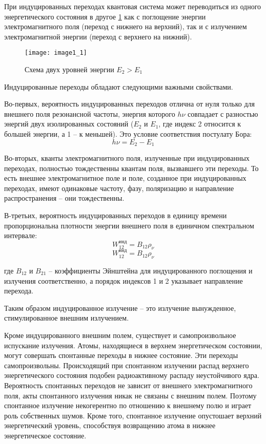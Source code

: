 
При индуцированных переходах квантовая система может переводиться из одного 
энергетического состояния в другое \ref{img1.1} как с поглощение энергии 
электромагнитного поля (переход с нижнего на верхний), так и с излучением 
электромагнитной энергии (переход с верхнего на нижний).

\begin{figure}[h!]
	\center
	\texttt{[image: image1\_1]} \\
	\caption{Схема двух уровней энергии \( E_2 > E_1 \)}
	\label{img1.1}
\end{figure}

Индуцированные переходы обладают следующими важными свойствами.

Во-первых, вероятность индуцированных переходов отлична от нуля только для 
внешнего поля резонансной частоты, энергия которого \( h\nu \) совпадает с 
разностью энергий двух изолированных состояний (\( E_2 \) и \( E_1 \), где 
индекс 2 относится к большей энергии, а 1 -- к меньшей). Это условие 
соответствия постулату Бора:
\[
	h\nu = E_2 - E_1
\]

Во-вторых, кванты электромагнитного поля, излученные при индуцированных 
переходах, полностью тождественны квантам поля, вызвавшего эти переходы. 
То есть внешнее электромагнитное поле и поле, созданное при индуцированных 
переходах, имеют одинаковые частоту, фазу, поляризацию и направление 
распространения -- они тождественны.

В-третьих, вероятность индуцированных переходов в единицу времени 
пропорциональна плотности энергии внешнего поля в единичном спектральном 
интервале:
\[
	W_{12}^\text{инд} = B_{12}\rho_\nu
\]
\[
	W_{12}^\text{инд} = B_{12}\rho_\nu
\]

где \( B_{12} \) и  \( B_{21} \) -- коэффициенты Эйнштейна для индуцированного 
поглощения и излучения соответственно, а порядок индексов 1 и 2 указывает 
направление перехода.

Таким образом индуцированное излучение -- это излучение вынужденное, 
стимулированное внешним излучением. 

Кроме индуцированного внешним полем, существует и самопроизвольное испускание 
излучения. Атомы, находящиеся в верхнем энергетическом состоянии, могут 
совершать спонтанные переходы в нижнее состояние. Эти переходы 
самопроизвольны. Происходящий при спонтанном излучении распад верхнего 
энергетического состояния подобен радиоактивному распаду неустойчивого ядра. 
Вероятность спонтанных переходов не зависит от внешнего электромагнитного 
поля, акты спонтанного излучения никак не связаны с внешним полем. Поэтому 
спонтанное излучение некогерентно по отношению к внешнему полю и играет 
роль собственных шумов. Кроме того, спонтанное излучение опустошает верхний 
энергетический уровень, способствуя возвращению атома в нижнее энергетическое 
состояние.

